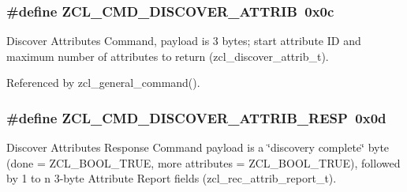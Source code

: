 \hypertarget{group__zcl_ga2919d6fc8068efac4c9969938a4b9ff5}{
\subsubsection[{Z\-C\-L\-\_\-\-C\-M\-D\-\_\-\-D\-I\-S\-C\-O\-V\-E\-R\-\_\-\-A\-T\-T\-R\-I\-B}]{\setlength{\rightskip}{0pt plus 5cm}\#define Z\-C\-L\-\_\-\-C\-M\-D\-\_\-\-D\-I\-S\-C\-O\-V\-E\-R\-\_\-\-A\-T\-T\-R\-I\-B~0x0c}}\label{group__zcl_ga2919d6fc8068efac4c9969938a4b9ff5}


Discover Attributes Command, payload is 3 bytes; start attribute I\-D and maximum number of attributes to return (zcl\-\_\-discover\-\_\-attrib\-\_\-t). 



Referenced by zcl\-\_\-general\-\_\-command().

\hypertarget{group__zcl_gae15c30229c1d8a8cdee1bd92b2cc6a15}{
\subsubsection[{Z\-C\-L\-\_\-\-C\-M\-D\-\_\-\-D\-I\-S\-C\-O\-V\-E\-R\-\_\-\-A\-T\-T\-R\-I\-B\-\_\-\-R\-E\-S\-P}]{\setlength{\rightskip}{0pt plus 5cm}\#define Z\-C\-L\-\_\-\-C\-M\-D\-\_\-\-D\-I\-S\-C\-O\-V\-E\-R\-\_\-\-A\-T\-T\-R\-I\-B\-\_\-\-R\-E\-S\-P~0x0d}}\label{group__zcl_gae15c30229c1d8a8cdee1bd92b2cc6a15}


Discover Attributes Response Command payload is a \char`\"{}discovery complete\char`\"{} byte (done = Z\-C\-L\-\_\-\-B\-O\-O\-L\-\_\-\-T\-R\-U\-E, more attributes = Z\-C\-L\-\_\-\-B\-O\-O\-L\-\_\-\-T\-R\-U\-E), followed by 1 to n 3-\/byte Attribute Report fields (zcl\-\_\-rec\-\_\-attrib\-\_\-report\-\_\-t). 




